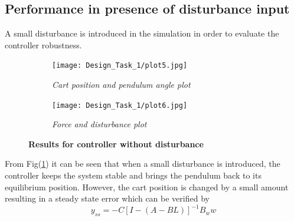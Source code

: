 \documentclass[a4paper,12pt]{article}
\begin{document}
	\subsection{Performance in presence of disturbance input}
	A small disturbance is introduced in the simulation in order to evaluate the controller robustness. 
	\begin{figure}[H]
	\centering
	\begin{subfigure}[b]{0.75\textwidth}
	    \texttt{[image: Design\_Task\_1/plot5.jpg]}
	    \caption{\textit{Cart position and pendulum angle plot}}
	    \end{subfigure}
	    \vspace{1em}
	    \begin{subfigure}[b]{0.75\textwidth}
	    \texttt{[image: Design\_Task\_1/plot6.jpg]}
	    \caption{\textit{Force and disturbance plot}}
	    \end{subfigure}
	    \caption{\textbf{Results for controller without disturbance}}
	    \label{fig2.2}
	\end{figure}
	From Fig(\ref{fig2.2}) it can be seen that when a small disturbance is introduced, the controller keeps the system stable and brings the pendulum back to its equilibrium position. However, the cart position is changed by a small amount resulting in a steady state error which can be verified by 
	\begin{equation}
    y_{ss} = -C[I - (A - BL)]^{-1} B_w w
    \end{equation}
\end{document}
